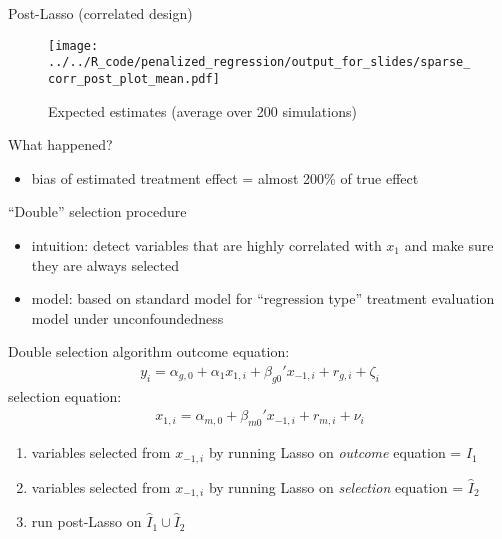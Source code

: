 \documentclass[xcolor=dvipsnames]{beamer}
\begin{document}
\begin{frame}{Post-Lasso (correlated design)}
\begin{figure}
  \texttt{[image: ../../R\_code/penalized\_regression/output\_for\_slides/sparse\_corr\_post\_plot\_mean.pdf]}
   \caption{Expected estimates (average over 200 simulations)}
\end{figure}
\end{frame}

\begin{frame}{What happened?}
\begin{itemize}
  \item bias of estimated treatment effect = almost 200\% of true effect
\end{itemize}
\end{frame}

\begin{frame}{``Double'' selection procedure \parencite{belloni2014inference}}
\begin{itemize}
  \item intuition: detect variables that are highly correlated with $x_1$ and make sure they are always selected
  \item model: based on standard model for ``regression type'' treatment evaluation model under unconfoundedness
\end{itemize}
\end{frame}

\begin{frame}{Double selection algorithm}
outcome equation:
\begin{align*}
  y_i = \alpha_{g, 0} + \alpha_1 x_{1,i} + \beta_{g0}' x_{-1, i} + r_{g, i} + \zeta_i
\end{align*}
selection equation: 
\begin{align*}
  x_{1, i} = \alpha_{m, 0} + \beta_{m0}' x_{-1, i} + r_{m, i} + \nu_i
\end{align*}
\begin{enumerate}
  \item variables selected from $x_{-1, i}$ by running Lasso on \emph{outcome} equation = $\hat{I}_1$
  \item variables selected from $x_{-1, i}$ by running Lasso on \emph{selection} equation = $\hat{I}_2$
  \item run post-Lasso on $\hat{I}_1 \cup \hat{I}_2$
\end{enumerate}
\end{frame}
\end{document}
